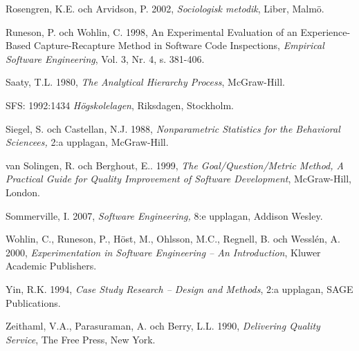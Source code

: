 Rosengren, K.E. och Arvidson, P. 2002, \emph{Sociologisk metodik},
Liber, Malmö.

Runeson, P. och Wohlin, C. 1998, An Experimental Evaluation of an
Experience-Based Capture-Recapture Method in Software Code Inspections,
\emph{Empirical Software Engineering}, Vol. 3, Nr. 4, s. 381-406.

Saaty, T.L. 1980, \emph{The Analytical Hierarchy Process}, McGraw-Hill.

SFS: 1992:1434 \emph{Högskolelagen}, Riksdagen, Stockholm.

Siegel, S. och Castellan, N.J. 1988, \emph{Nonparametric Statistics for
the Behavioral Sciencees,} 2:a upplagan, McGraw-Hill.

van Solingen, R. och Berghout, E.. 1999, \emph{The Goal/Question/Metric
Method, A Practical Guide for Quality Improvement of Software
Development}, McGraw-Hill, London.

Sommerville, I. 2007, \emph{Software Engineering,} 8:e upplagan, Addison
Wesley.

Wohlin, C., Runeson, P., Höst, M., Ohlsson, M.C., Regnell, B. och
Wesslén, A. 2000, \emph{Experimentation in Software Engineering -- An
Introduction}, Kluwer Academic Publishers.

Yin, R.K. 1994, \emph{Case Study Research -- Design and Methods}, 2:a
upplagan, SAGE Publications.

Zeithaml, V.A., Parasuraman, A. och Berry, L.L. 1990, \emph{Delivering
Quality Service}, The Free Press, New York.

